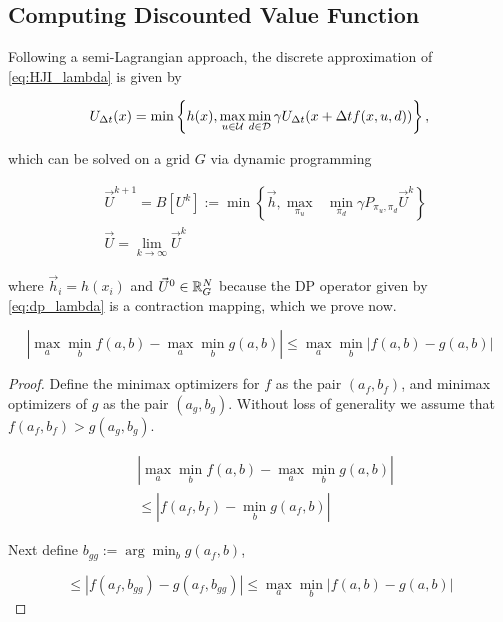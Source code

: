 \subsection{Computing Discounted Value Function}
Following a semi-Lagrangian approach, the discrete approximation of \eqref{eq:HJI_lambda} is given by

\begin{equation}\label{eq:U_lambda_approx}
    U_{\Delta t} (x) = \min\left\{h(x), \max_{u\in\mathcal{U}} \min_{ d\in\mathcal{D}}  \gamma U_{\Delta t}(x+\Delta tf(x,u,d))\right\},
\end{equation}

\noindent which can be solved on a grid $G$ via dynamic programming


\begin{subequations}\label{eq:dp_lambda}
\begin{align}
&\vec{U}^{k+1} = B[U^k] := \min\left\{ \vec{h}, \underset{\pi_u}{\max}\text{ }\underset{ \pi_d}{\min} \gamma P_{\pi_u, \pi_d} \vec{U}^k \right \} \label{eq:dp_bellman_lambda_a}  \\
&\vec{U} = \lim_{k\rightarrow \infty} \vec{U}^{k}
\end{align}
\end{subequations}

\noindent where $\vec{h}_i = h(x_i)$ and $\vec{U}^{0} \in \mathbb{R}^N_G$ because the DP operator given by \eqref{eq:dp_lambda} is a contraction mapping, which we prove now.


\begin{lemma}\label{lem:maxmin}
\begin{equation} 
|\max_a \min_b f(a,b) -\max_a \min_b g(a,b)| \leq \max_a \min_b |f(a,b) - g(a,b)|
\end{equation}
\end{lemma}

\begin{proof}
Define the minimax optimizers for $f$ as the pair $(a_f,b_f)$, and minimax optimizers of $g$ as the pair $(a_g, b_g)$. Without loss of generality we assume that $f(a_f,b_f) > g(a_g,b_g)$.

\begin{equation*}
\begin{split}
&|\max_a \min_b f(a,b) -\max_a \min_b g(a,b)|\\
&\leq |f(a_f,b_f) - \min_b g(a_f,b)|
\end{split}
\end{equation*}

\noindent Next define $b_{gg} :=\arg\min_b g(a_f,b)$,

\begin{equation*}
\leq |f(a_f,b_{gg}) - g(a_f,b_{gg})| \leq \max_a \min_b |f(a,b) - g(a,b)|
\end{equation*}
\end{proof}


